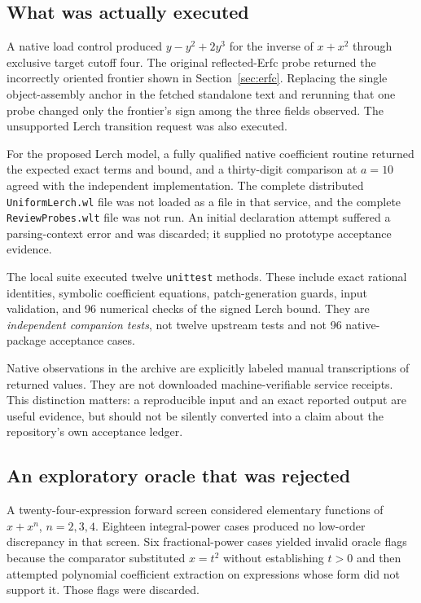 \documentclass[11pt,a4paper]{article}
\newcommand{\code}[1]{\nolinkurl{#1}}
\begin{document}
\subsection{What was actually executed}

A native load control produced $y-y^2+2y^3$ for the inverse of $x+x^2$ through
exclusive target cutoff four. The original reflected-Erfc probe returned the
incorrectly oriented frontier shown in Section~\ref{sec:erfc}. Replacing the
single object-assembly anchor in the fetched standalone text and rerunning
that one probe changed only the frontier's sign among the three fields
observed. The unsupported Lerch transition request was also executed.

For the proposed Lerch model, a fully qualified native coefficient routine
returned the expected exact terms and bound, and a thirty-digit comparison at
$a=10$ agreed with the independent implementation. The complete distributed
\code{UniformLerch.wl} file was not loaded as a file in that service, and the
complete \code{ReviewProbes.wlt} file was not run. An initial declaration
attempt suffered a parsing-context error and was discarded; it supplied no
prototype acceptance evidence.

The local suite executed twelve \code{unittest} methods. These include exact
rational identities, symbolic coefficient equations, patch-generation guards,
input validation, and 96 numerical checks of the signed Lerch bound. They are
\emph{independent companion tests}, not twelve upstream tests and not 96
native-package acceptance cases.

Native observations in the archive are explicitly labeled manual
transcriptions of returned values. They are not downloaded machine-verifiable
service receipts. This distinction matters: a reproducible input and an exact
reported output are useful evidence, but should not be silently converted into
a claim about the repository's own acceptance ledger.

\subsection{An exploratory oracle that was rejected}

A twenty-four-expression forward screen considered elementary functions of
$x+x^n$, $n=2,3,4$. Eighteen integral-power cases produced no low-order
discrepancy in that screen. Six fractional-power cases yielded invalid oracle
flags because the comparator substituted $x=t^2$ without establishing $t>0$
and then attempted polynomial coefficient extraction on expressions whose
form did not support it. Those flags were discarded.
\end{document}
